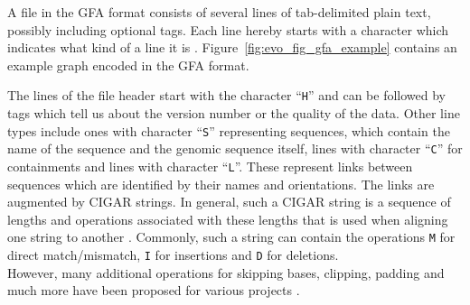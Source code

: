 \documentclass[a4paper,12pt,twoside,BCOR=10mm]{scrbook}
\begin{document}
A file in the GFA format consists of several lines of tab-delimited plain text, possibly including optional tags.
Each line hereby starts with a character which indicates what kind of a line it is \citep{specGFAnew}.
Figure~\ref{fig:evo_fig_gfa_example} contains an example graph encoded in the GFA format.

The lines of the file header start with the character “\texttt{H}” and can be followed by tags which tell us about the
version number or the quality of the data.
Other line types include ones with character “\texttt{S}” representing sequences, which
contain the name of the sequence and the genomic sequence itself,
lines with character “\texttt{C}” for containments
and lines with character “\texttt{L}”.
These represent links between sequences which are identified by their names and orientations.
The links are augmented by CIGAR strings.
In general, such a CIGAR string is a sequence of lengths and operations
associated with these lengths that is used when aligning one string to another \citep{specSAM}.
Commonly, such a string can contain the operations \texttt{M} for direct match/mismatch,
\texttt{I} for insertions and \texttt{D} for deletions. \\
However, many additional operations for skipping bases,
clipping, padding and much more have been proposed
for various projects \citep{specGFA1,SAM2009}.
\end{document}
